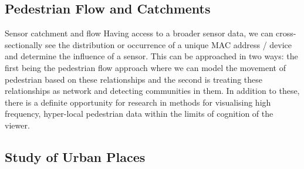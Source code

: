 \subsection{Pedestrian Flow and Catchments}
Sensor catchment and flow Having access to a broader sensor data, we can cross-sectionally see the distribution or occurrence of a unique MAC address / device and determine the influence of a sensor.
This can be approached in two ways: the first being the pedestrian flow approach where we can model the movement of pedestrian based on these relationships and the second is treating these relationships as network and detecting communities in them.
In addition to these, there is a definite opportunity for research in methods for visualising high frequency, hyper-local pedestrian data within the limits of cognition of the viewer.


\subsection{Study of Urban Places}
